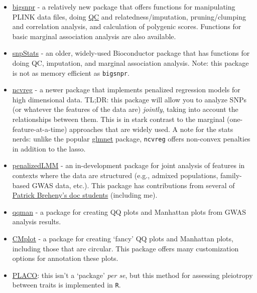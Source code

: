 \documentclass[
]{book}
\begin{document}
\begin{itemize}
\item
  \href{https://privefl.github.io/bigsnpr/index.html}{bigsnpr} - a relatively new package that offers functions for manipulating PLINK data files, doing \protect\hyperlink{acronyms}{QC} and relatedness/imputation, pruning/clumping and correlation analysis, and calculation of polygenic scores. Functions for basic marginal association analysis are also available.
\item
  \href{https://www.bioconductor.org/packages/release/bioc/html/snpStats.html}{snpStats} - an older, widely-used Bioconductor package that has functions for doing QC, imputation, and marginal association analysis. Note: this package is not as memory efficient as \texttt{bigsnpr}.
\item
  \href{https://pbreheny.github.io/ncvreg/}{ncvreg} - a newer package that implements penalized regression models for high dimensional data. TL;DR: this package will allow you to analyze SNPs (or whatever the features of the data are) \emph{jointly}, taking into account the relationships between them. This is in stark contrast to the marginal (one-feature-at-a-time) approaches that are widely used. A note for the stats nerds: unlike the popular \href{https://glmnet.stanford.edu/articles/glmnet.html\#:~:text=Glmnet\%20is\%20a\%20package\%20that,for\%20the\%20regularization\%20parameter\%20lambda.}{glmnet} package, \texttt{ncvreg} offers non-convex penalties in addition to the lasso.
\item
  \href{https://areisett.github.io/penalizedLMM/}{penalizedLMM} - an in-development package for joint analysis of features in contexts where the data are structured (e.g., admixed populations, family-based GWAS data, etc.). This package has contributions from several of \href{https://myweb.uiowa.edu/pbreheny/students.html}{Patrick Breheny's doc students} (including me).
\item
  \href{https://cran.r-project.org/web/packages/qqman/}{qqman} - a package for creating QQ plots and Manhattan plots from GWAS analysis results.
\item
  \href{https://github.com/YinLiLin/CMplot}{CMplot} - a package for creating `fancy' QQ plots and Manhattan plots, including those that are circular. This package offers many customization options for annotation these plots.
\item
  \href{https://github.com/RayDebashree/PLACO}{PLACO}: this isn't a `package' \emph{per se}, but this method for assessing pleiotropy between traits is implemented in \texttt{R}.
\end{itemize}
\end{document}
